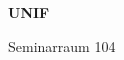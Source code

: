 \documentclass[a4paper]{article}
\begin{document}
\printGenericVSLHeader
\begin{center}
\begin{vsltext}{3cm}{4cm}

   \vspace{0.5cm} 

    \textbf{UNIF} 

    \vspace{1.5cm}

    Seminarraum 104

\end{vsltext}

\end{center}
\end{document}
